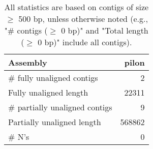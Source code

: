 \documentclass[12pt,a4paper]{article}
\begin{document}
\begin{table}[ht]
\begin{center}
\caption{All statistics are based on contigs of size $\geq$ 500 bp, unless otherwise noted (e.g., "\# contigs ($\geq$ 0 bp)" and "Total length ($\geq$ 0 bp)" include all contigs).}
\begin{tabular}{|l*{1}{|r}|}
\hline
Assembly & pilon \\ \hline
\# fully unaligned contigs & 2 \\ \hline
Fully unaligned length & 22311 \\ \hline
\# partially unaligned contigs & 9 \\ \hline
Partially unaligned length & 568862 \\ \hline
\# N's & 0 \\ \hline
\end{tabular}
\end{center}
\end{table}
\end{document}
